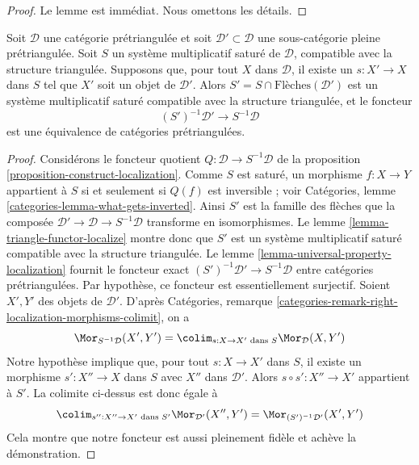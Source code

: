 \begin{proof}
Le lemme est immédiat. Nous omettons les détails.
\end{proof}

\begin{lemma}
\label{lemma-localization-subcategory}
Soit $\mathcal{D}$ une catégorie prétriangulée et soit
$\mathcal{D}' \subset \mathcal{D}$ une sous-catégorie pleine prétriangulée.
Soit $S$ un système multiplicatif saturé de $\mathcal{D}$, compatible avec la
structure triangulée. Supposons que, pour tout $X$ dans $\mathcal{D}$, il existe
un $s : X' \to X$ dans $S$ tel que $X'$ soit un objet de $\mathcal{D}'$.
Alors $S' = S \cap \text{Flèches}(\mathcal{D}')$ est un système multiplicatif
saturé compatible avec la structure triangulée, et le foncteur
$$
(S')^{-1}\mathcal{D}' \longrightarrow S^{-1}\mathcal{D}
$$
est une équivalence de catégories prétriangulées.
\end{lemma}

\begin{proof}
Considérons le foncteur quotient $Q : \mathcal{D} \to S^{-1}\mathcal{D}$ de la
proposition \ref{proposition-construct-localization}.
Comme $S$ est saturé, un morphisme $f : X \to Y$ appartient à $S$ si et
seulement si $Q(f)$ est inversible ; voir Catégories, lemme
\ref{categories-lemma-what-gets-inverted}.
Ainsi $S'$ est la famille des flèches que la composée
$\mathcal{D}' \to \mathcal{D} \to S^{-1}\mathcal{D}$ transforme en
isomorphismes. Le lemme \ref{lemma-triangle-functor-localize} montre donc que
$S'$ est un système multiplicatif saturé compatible avec la structure
triangulée. Le lemme \ref{lemma-universal-property-localization} fournit le
foncteur exact $(S')^{-1}\mathcal{D}' \to S^{-1}\mathcal{D}$ entre catégories
prétriangulées. Par hypothèse, ce foncteur est essentiellement surjectif.
Soient $X', Y'$ des objets de $\mathcal{D}'$. D'après Catégories, remarque
\ref{categories-remark-right-localization-morphisms-colimit}, on a
$$
\Mor_{S^{-1}\mathcal{D}}(X', Y') =
\colim_{s : X \to X'\text{ dans }S} \Mor_\mathcal{D}(X, Y')
$$
Notre hypothèse implique que, pour tout $s : X \to X'$ dans $S$, il existe un
morphisme $s' : X'' \to X$ dans $S$ avec $X''$ dans $\mathcal{D}'$.
Alors $s \circ s' : X'' \to X'$ appartient à $S'$. La colimite ci-dessus est
donc égale à
$$
\colim_{s'' : X'' \to X'\text{ dans }S'} \Mor_{\mathcal{D}'}(X'', Y') =
\Mor_{(S')^{-1}\mathcal{D}'}(X', Y')
$$
Cela montre que notre foncteur est aussi pleinement fidèle et achève la
démonstration.
\end{proof}

